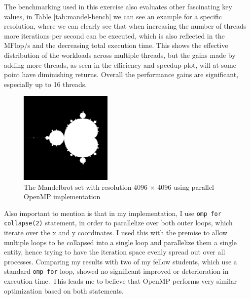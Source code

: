 The benchmarking used in this exercise also evaluates other fascinating key values, in Table \ref{tab:mandel-bench} we can see an example for a specific resolution, where we can clearly see that when increasing the number of threads more iterations per second can be executed, which is also reflected in the MFlop/s and the decreasing total execution time. This shows the effective distribution of the workloads across multiple threads, but the gains made by adding more threads, as seen in the efficiency and speedup plot, will at some point have diminishing returns. 
Overall the performance gains are significant, especially up to 16 threads.
\begin{figure}[H]
    \centering
        \centering
        \includegraphics[width=0.4\textwidth]{../media/mandel_parallel.png}
        \caption{The Mandelbrot set with resolution 4096 $\times$ 4096 using parallel OpenMP implementation}
        \label{fig:mandel_imaage}
    \end{figure}
Also important to mention is that in my implementation, I use \texttt{omp for collapse(2)} statement, in order to parallelize over both outer loops, which iterate over the x and y coordinates. I used this with the premise to allow multiple loops to be collapsed into a single loop and parallelize them a single entity, hence trying to have the iteration space evenly spread out over all processes. Comparing my results with two of my fellow students, which use a standard \texttt{omp for} loop, showed no significant improved or deterioration in execution time. This leads me to believe that OpenMP performs very similar optimization based on both statements.
